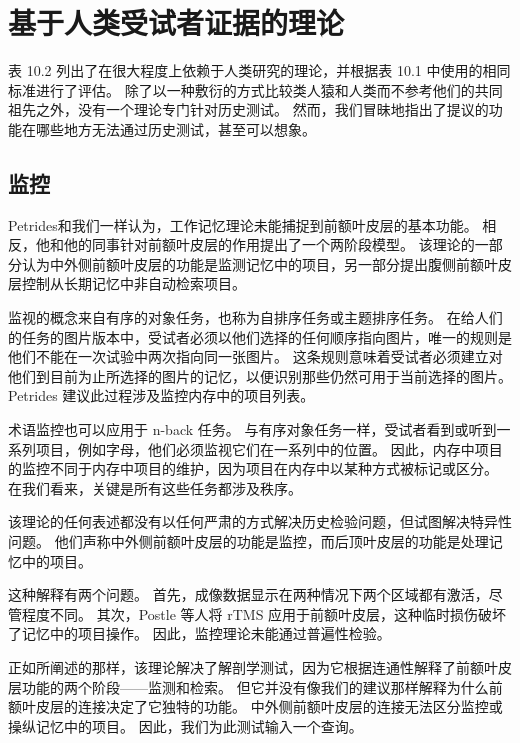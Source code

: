 \section{基于人类受试者证据的理论}

表 10.2 列出了在很大程度上依赖于人类研究的理论，并根据表 10.1 中使用的相同标准进行了评估。
除了以一种敷衍的方式比较类人猿和人类而不参考他们的共同祖先之外，没有一个理论专门针对历史测试。
然而，我们冒昧地指出了提议的功能在哪些地方无法通过历史测试，甚至可以想象。



\subsection{监控}

Petrides\cite{petrides1994frontal}和我们一样认为，工作记忆理论未能捕捉到前额叶皮层的基本功能。
相反，他和他的同事针对前额叶皮层的作用提出了一个两阶段模型\cite{owen1996evidence}。
该理论的一部分认为中外侧前额叶皮层的功能是监测记忆中的项目，另一部分提出腹侧前额叶皮层控制从长期记忆中非自动检索项目。
\par


监视的概念来自有序的对象任务，也称为自排序任务或主题排序任务。
在给人们的任务的图片版本中，受试者必须以他们选择的任何顺序指向图片，唯一的规则是他们不能在一次试验中两次指向同一张图片。
这条规则意味着受试者必须建立对他们到目前为止所选择的图片的记忆，以便识别那些仍然可用于当前选择的图片。
Petrides 建议此过程涉及监控内存中的项目列表。
\par


术语监控也可以应用于 n-back 任务。
与有序对象任务一样，受试者看到或听到一系列项目，例如字母，他们必须监视它们在一系列中的位置。
因此，内存中项目的监控不同于内存中项目的维护，因为项目在内存中以某种方式被标记或区分。
在我们看来，关键是所有这些任务都涉及秩序。
\par


该理论的任何表述都没有以任何严肃的方式解决历史检验问题，但\cite{champod2007dissociable}试图解决特异性问题。
他们声称中外侧前额叶皮层的功能是监控，而后顶叶皮层的功能是处理记忆中的项目。
\par


这种解释有两个问题。
首先，成像数据显示在两种情况下两个区域都有激活，尽管程度不同。
其次，Postle 等人\cite{postle2006repetitive}将 rTMS 应用于前额叶皮层，这种临时损伤破坏了记忆中的项目操作。
因此，监控理论未能通过普遍性检验。
\par


正如所阐述的那样，该理论解决了解剖学测试，因为它根据连通性解释了前额叶皮层功能的两个阶段——监测和检索。
但它并没有像我们的建议那样解释为什么前额叶皮层的连接决定了它独特的功能。
中外侧前额叶皮层的连接无法区分监控或操纵记忆中的项目。
因此，我们为此测试输入一个查询。



